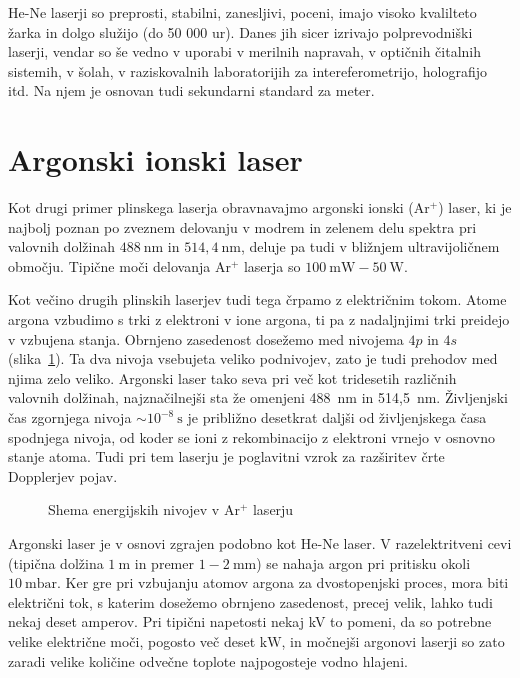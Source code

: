 He-Ne laserji so preprosti, stabilni, zanesljivi, poceni, imajo visoko kvalilteto žarka
in dolgo služijo (do 50 000 ur).
Danes jih sicer izrivajo polprevodniški laserji, vendar so še vedno v uporabi
v merilnih napravah, v optičnih čitalnih sistemih, v šolah, v raziskovalnih 
laboratorijih za intereferometrijo, holografijo itd. Na njem je osnovan tudi 
sekundarni standard za meter.

\section{Argonski ionski laser}

Kot drugi primer plinskega laserja obravnavajmo argonski ionski (Ar$^+$) laser,
ki je najbolj poznan po zveznem delovanju v modrem in zelenem delu spektra pri 
valovnih dolžinah $488~\si{\nano\metre}$ in $514,4~\si{\nano\metre}$, deluje 
pa tudi v bližnjem ultravijoličnem območju. Tipične moči delovanja Ar$^+$ laserja
so $100~\si{\milli\watt} - 50~\si{\watt}$.

Kot večino drugih plinskih laserjev tudi tega črpamo z električnim tokom.
Atome argona vzbudimo s trki z elektroni v ione argona, ti pa z nadaljnjimi
trki preidejo v vzbujena stanja. Obrnjeno zasedenost
dosežemo med nivojema $4p$ in $4s$ (slika~\ref{fig:ArE}). 
Ta dva nivoja vsebujeta veliko podnivojev, zato je tudi prehodov med
njima zelo veliko. Argonski laser tako seva pri več kot tridesetih različnih
valovnih dolžinah, najznačilnejši sta že omenjeni 488~nm in 514,5~nm. 
Življenjski čas zgornjega nivoja $\sim 10^{-8}~\si{\second}$ je približno 
desetkrat daljši od življenjskega časa spodnjega nivoja, od koder se ioni
z rekombinacijo z elektroni vrnejo v osnovno stanje atoma. Tudi pri tem laserju
je poglavitni vzrok za razširitev črte Dopplerjev pojav. 

\begin{figure}[h]
\centering
\def\svgwidth{80truemm} 

\caption{Shema energijskih nivojev v Ar$^+$ laserju}
\label{fig:ArE}
\end{figure}

Argonski laser je v osnovi zgrajen podobno kot He-Ne laser. V razelektritveni cevi
(tipična dolžina $1~\si{\metre}$ in premer $1-2~\si{\milli\metre}$)
se nahaja argon pri pritisku okoli $10~\si{\milli\bar}$. Ker gre pri 
vzbujanju atomov argona za dvostopenjski proces, mora biti električni tok, 
s katerim dosežemo obrnjeno zasedenost, precej velik, lahko tudi nekaj deset amperov. 
Pri tipični napetosti nekaj kV to pomeni, da so potrebne velike električne moči, 
pogosto več deset $\si{\kilo\watt}$, in močnejši argonovi laserji so zato zaradi 
velike količine odvečne toplote najpogosteje vodno hlajeni.

